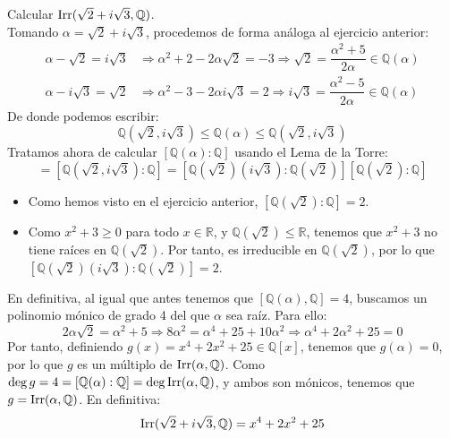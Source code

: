 \begin{ejercicio}
    Calcular $\operatorname{Irr}(\sqrt{2}+i\sqrt{3},\mathbb{Q})$.\\

    \noindent
    Tomando $\alpha = \sqrt{2}+i\sqrt{3}$, procedemos de forma análoga al ejercicio anterior:
    \begin{align*}
        \alpha-\sqrt{2} = i\sqrt{3} &\Longrightarrow \alpha^2 + 2 - 2\alpha\sqrt{2} = -3 \Longrightarrow \sqrt{2} = \dfrac{\alpha^2+5}{2\alpha} \in \mathbb{Q}(\alpha)\\
        \alpha-i\sqrt{3} = \sqrt{2} &\Longrightarrow \alpha^2 -3 -2\alpha i \sqrt{3} = 2 \Longrightarrow i\sqrt{3} = \dfrac{\alpha^2-5}{2\alpha} \in \mathbb{Q}(\alpha)
    \end{align*}
    De donde podemos escribir:
    \begin{equation*}
        \mathbb{Q}(\sqrt{2},i\sqrt{3}) \leq \mathbb{Q}(\alpha) \leq \mathbb{Q}(\sqrt{2},i\sqrt{3})
    \end{equation*}
    Tratamos ahora de calcular $[\mathbb{Q}(\alpha):\mathbb{Q}]$ usando el Lema de la Torre:
    \begin{equation*}
        [\mathbb{Q}(\alpha):\mathbb{Q}] = [\mathbb{Q}(\sqrt{2},i\sqrt{3}):\mathbb{Q}] = [\mathbb{Q}(\sqrt{2})(i\sqrt{3}):\mathbb{Q}(\sqrt{2})][\mathbb{Q}(\sqrt{2}):\mathbb{Q}]
    \end{equation*}
    \begin{itemize}
        \item Como hemos visto en el ejercicio anterior, $[\mathbb{Q}(\sqrt{2}):\mathbb{Q}]=2$.
        \item Como $x^2+3\geq 0$ para todo $x\in \mathbb{R}$, y $\mathbb{Q}(\sqrt{2})\leq \mathbb{R}$, tenemos que $x^2+3$ no tiene raíces en $\mathbb{Q}(\sqrt{2})$. Por tanto, es irreducible en $\mathbb{Q}(\sqrt{2})$, por lo que $[\mathbb{Q}(\sqrt{2})(i\sqrt{3}):\mathbb{Q}(\sqrt{2})] = 2$.
    \end{itemize}
    En definitiva, al igual que antes tenemos que $[\mathbb{Q}(\alpha),\mathbb{Q}] = 4$, buscamos un polinomio mónico de grado 4 del que $\alpha$ sea raíz. Para ello:
    \begin{equation*}
        2\alpha\sqrt{2} = \alpha^2 + 5 \Longrightarrow 8\alpha^2 = \alpha^4 + 25 + 10\alpha^2 \Longrightarrow \alpha^4 + 2\alpha^2 + 25 = 0
    \end{equation*}
    Por tanto, definiendo $g(x) = x^4 + 2x^2 + 25\in \mathbb{Q}[x]$, tenemos que $g(\alpha)=0$, por lo que $g$ es un múltiplo de $\operatorname{Irr}(\alpha,\mathbb{Q})$. Como $\deg g = 4 = [\mathbb{Q}(\alpha):\mathbb{Q}] = \deg \operatorname{Irr}(\alpha,\mathbb{Q})$, y ambos son mónicos, tenemos que $g = \operatorname{Irr}(\alpha,\mathbb{Q})$. En definitiva:
    \begin{equation*}
        \operatorname{Irr}(\sqrt{2}+i\sqrt{3},\mathbb{Q}) = x^4 + 2x^2 + 25
    \end{equation*}
\end{ejercicio}

